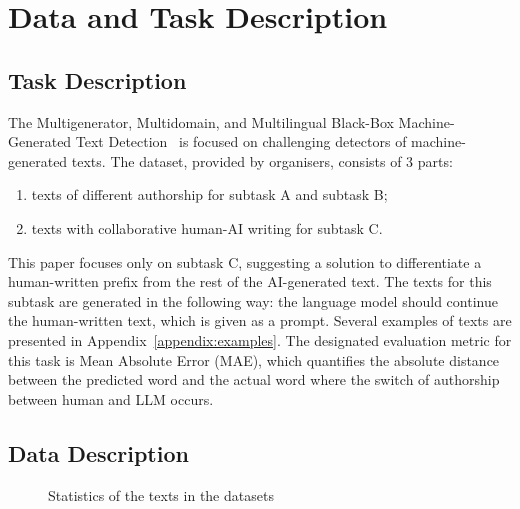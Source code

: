 \documentclass[11pt]{article}
\begin{document}
 \section{Data and Task Description}
 \label{dataset_desc}
 \subsection{Task Description}

 The Multigenerator, Multidomain, and Multilingual Black-Box Machine-Generated Text Detection~\cite{semeval2024task8} is focused on challenging detectors of machine-generated texts.
    The dataset, provided by organisers, consists of 3 parts:
 \begin{enumerate}
     \item texts of different authorship for subtask A and subtask B;
     \item texts with collaborative human-AI writing for subtask C.
 \end{enumerate}
This paper focuses only on subtask C, suggesting a solution to differentiate a human-written prefix from the rest of the AI-generated text.  The texts for this subtask are generated in the following way: the language model should continue the human-written text, which is given as a prompt. Several examples of texts are presented in Appendix~\ref{appendix:examples}. The designated evaluation metric for this task is Mean Absolute Error (MAE), which quantifies the absolute distance between the predicted word and the actual word where the switch of authorship between human and LLM occurs.
 
 \subsection{Data Description}
 \begin{figure}[!htb]
    \centering
    \hfill%
    \caption{Statistics of the texts in the datasets}
\end{figure}
\end{document}
